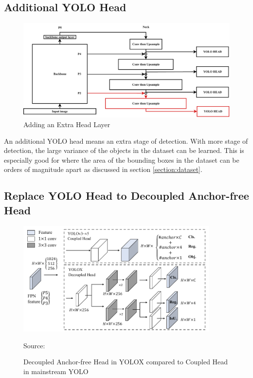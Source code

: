   \subsection{Additional YOLO Head}
  \begin{figure}[H]
    \centering
    \includegraphics[width=.9\textwidth]{figures/addmorehead.pdf}
    \caption{Adding an Extra Head Layer}
    \label{fig:addmorehead}
  \end{figure}
  An additional YOLO head means an extra stage of detection.
  With more stage of detection, the large variance of the objects in the dataset can be learned.
  This is especially good for \textcite{aot_dataset} where the area of the bounding boxes in the dataset
  can be orders of magnitude apart as discussed in section \ref{section:dataset}.
  

  \subsection{Replace YOLO Head to Decoupled Anchor-free Head}
  \begin{figure}[H]
    \centering
    \includegraphics[width=0.9\textwidth]{figures/anchorfree-yolox.png}
    \caption*{Source: \textcite{yolox}}
    \caption{Decoupled Anchor-free Head in YOLOX compared to Coupled Head in mainstream YOLO}
    \label{fig:anchorfree}
  \end{figure}

